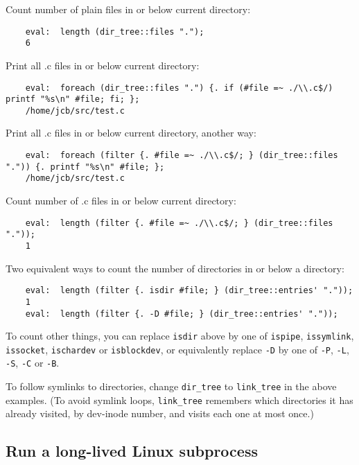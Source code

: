 Count number of plain files in or below current directory:
\begin{verbatim}
    eval:  length (dir_tree::files ".");
    6
\end{verbatim}

Print all .c files in or below current directory:
\begin{verbatim}
    eval:  foreach (dir_tree::files ".") {. if (#file =~ ./\\.c$/) printf "%s\n" #file; fi; };
    /home/jcb/src/test.c
\end{verbatim}

Print all .c files in or below current directory, another way:
\begin{verbatim}
    eval:  foreach (filter {. #file =~ ./\\.c$/; } (dir_tree::files ".")) {. printf "%s\n" #file; };
    /home/jcb/src/test.c
\end{verbatim}

Count number of .c files in or below current directory:
\begin{verbatim}
    eval:  length (filter {. #file =~ ./\\.c$/; } (dir_tree::files "."));
    1
\end{verbatim}

Two equivalent ways to count the number of 
directories in or below a directory:
\begin{verbatim}
    eval:  length (filter {. isdir #file; } (dir_tree::entries' "."));
    1
    eval:  length (filter {. -D #file; } (dir_tree::entries' "."));
\end{verbatim}

To count other things, you can replace {\tt isdir} above by one of 
{\tt ispipe}, 
{\tt issymlink}, 
{\tt issocket}, 
{\tt ischardev} or 
{\tt isblockdev}, or equivalently replace {\tt -D} by one of 
{\tt -P}, 
{\tt -L}, 
{\tt -S}, 
{\tt -C} or 
{\tt -B}.

To follow symlinks to directories, change {\tt dir\_tree} to 
{\tt link\_tree} in the above examples.  (To avoid symlink 
loops, {\tt link\_tree} remembers which directories it has 
already visited, by dev-inode number, and visits each one at 
most once.)


\cutend*

\subsection{Run a long-lived Linux subprocess}


